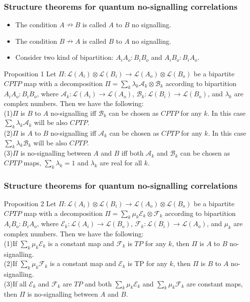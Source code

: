 \documentclass{beamer}
\begin{document}
\begin{frame}
\frametitle{Structure theorems for quantum no-signalling correlations}

\begin{itemize}
\item The condition $A \nrightarrow B$ is called $A$ to $B$ no signalling.
\item The condition $B \nrightarrow A$ is called $B$ to $A$ no signalling.
\item Consider two kind of bipartition: $A_i A_o:B_i B_o$ and $A_i B_o:B_i A_o$.
\end{itemize}
\begin{block}{Proposition 1}
Let $\Pi : \mathcal{L}(A_i)\otimes \mathcal{L}(B_i)\rightarrow \mathcal{L}(A_o)\otimes \mathcal{L}(B_o)$ be a bipartite $CPTP$ map with a decomposition $\Pi= \sum_k{\lambda_k \mathcal{A}_k \otimes \mathcal{B}_k}$ according to bipartition $A_i A_o:B_i B_o$, where $\mathcal{A}_k:\mathcal{L}(A_i)\rightarrow \mathcal{L}(A_o)$, $\mathcal{B}_k:\mathcal{L}(B_i)\rightarrow \mathcal{L}(B_o)$, and $\lambda_k$ are complex numbers. Then we have the following:\\
(1)$\Pi$ is $B$ to $A$ no-signalling iff $\mathcal{B}_k$ can be chosen as $CPTP$ for any $k$. In this case $\sum_k \lambda_k \mathcal{A}_k$ will be also $CPTP$.\\
(2)$\Pi$ is $A$ to $B$ no-signalling iff $\mathcal{A}_k$ can be chosen as $CPTP$ for any $k$. In this case $\sum_k \lambda_k \mathcal{B}_k$ will be also $CPTP$.\\
(3)$\Pi$ is no-signalling between $A$ and $B$ iff both $\mathcal{A}_k$ and $\mathcal{B}_k$ can be chosen as $CPTP$ maps, $\sum_k \lambda_k = 1$ and $\lambda_k$ are real for all $k$. \\
\end{block}
\end{frame}

\begin{frame}
\frametitle{Structure theorems for quantum no-signalling correlations}
\begin{block}{Proposition 2}
Let $\Pi : \mathcal{L}(A_i)\otimes \mathcal{L}(B_i)\rightarrow \mathcal{L}(A_o)\otimes \mathcal{L}(B_o)$ be a bipartite $CPTP$ map with a decomposition $\Pi= \sum_k{\mu_k \mathcal{E}_k \otimes \mathcal{F}_k}$ according to bipartition $A_i B_o:B_i A_o$, where $\mathcal{E}_k:\mathcal{L}(A_i)\rightarrow \mathcal{L}(B_o)$, $\mathcal{F}_k:\mathcal{L}(B_i)\rightarrow \mathcal{L}(A_o)$, and $\mu_k$ are complex numbers. Then we have the following:\\
(1)If $\sum_k \mu_k \mathcal{E}_k$ is a constant map and $\mathcal{F}_k$ is $TP$ for any $k$, then $\Pi$ is $A$ to $B$ no-signalling.\\
(2)If $\sum_k \mu_k \mathcal{F}_k$ is a constant map and $\mathcal{E}_k$ is TP for any $k$, then $\Pi$ is $B$ to $A$ no-signalling.\\
(3)If all $\mathcal{E}_k$ and $\mathcal{F}_k$ are $TP$ and both $\sum_k \mu_k \mathcal{E}_k$ and $\sum_k \mu_k \mathcal{F}_k$ are constant maps, then $\Pi$ is no-signalling between $A$ and $B$.\\
\end{block}
\end{frame}
\end{document}
